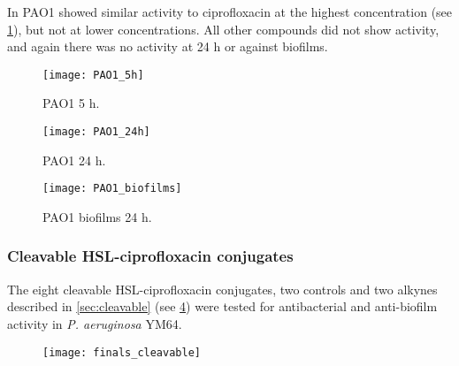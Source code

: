 In PAO1  showed similar activity to ciprofloxacin  at the highest concentration (see \ref{fgr:PAO1_5h}), but not at lower concentrations. All other compounds did not show activity, and again there was no activity at 24 h or against biofilms.

\begin{figure}[H]
	\begin{center}
		\texttt{[image: PAO1\_5h]}
		\caption{PAO1 5 h.\label{fgr:PAO1_5h}}
	\end{center}
\end{figure}

\begin{figure}[H]
	\begin{center}
		\texttt{[image: PAO1\_24h]}
		\caption{PAO1 24 h.\label{fgr:PAO1_24h}}
	\end{center}
\end{figure}

\begin{figure}[H]
	\begin{center}
		\texttt{[image: PAO1\_biofilms]}
		\caption{PAO1 biofilms 24 h.\label{fgr:PAO1_biofilms}}
	\end{center}
\end{figure}

\subsubsection{Cleavable HSL-ciprofloxacin conjugates}

The eight cleavable HSL-ciprofloxacin conjugates, two controls and two alkynes described in \ref{sec:cleavable} (see \ref{fgr:finals_cleavable}) were tested for antibacterial and anti-biofilm activity in \textit{P. aeruginosa} YM64. 

\begin{figure}[H]
	\begin{center}
		\texttt{[image: finals\_cleavable]}
		\caption{
 		\label{fgr:finals_cleavable}}
	\end{center}
\end{figure}

